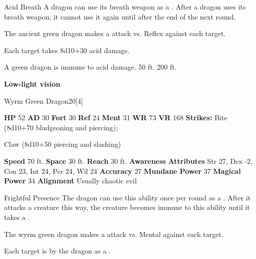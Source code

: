     \begin{freeability}{Acid Breath}
      A dragon can use its breath weapon as a .
      After a dragon uses its breath weapon, it cannot use it again until after the end of the next round.
      \par The ancient green dragon makes a  attack
        vs. Reflex against each target.
    
    \hit Each target takes 8d10+30 acid damage.
    \end{freeability}
  
      
       A green dragon is immune to acid damage.
     50 ft.
     200 ft.
    \par\noindent\textbf{Low-light vision}
  

  \begin{monsubsection}{Wyrm Green Dragon}{20}[4]
    \vspace{-1em}\vspace{-1em}
    \vspace{0em}

    
    

    \begin{spellcontent}
      \begin{spelltargetinginfo}
        \pari \textbf{HP} 52 \monsep
          \textbf{AD} 30 \monsep
          \textbf{Fort} 30 \monsep
          \textbf{Ref} 24 \monsep
          \textbf{Ment} 31
        \pari \textbf{WR} 73 \monsep
        \textbf{VR} 168
        \pari \textbf{Strikes:}
            Bite  (8d10+70 bludgeoning and piercing);
\par Claw  (8d10+50 piercing and slashing)
      \end{spelltargetinginfo}
    \end{spellcontent}
    \begin{monsterfooter}
      \pari \textbf{Speed} 70 ft. \monsep
        \textbf{Space} 30 ft. \monsep
        \textbf{Reach} 30 ft.
      \pari \textbf{Awareness} 
      \pari \textbf{Attributes}
        Str 27, Dex -2,
        Con 23, Int 24,
        Per 24, Wil 24
      \pari \textbf{Accuracy} 27 \monsep
        \textbf{Mundane Power} 37 \monsep
      \textbf{Magical Power} 34
      \pari \textbf{Alignment} Usually chaotic evil
    \end{monsterfooter}
  \end{monsubsection}
  \begin{freeability}{Frightful Presence}
      The dragon can use this ability once per round as a .
      After it attacks a creature this way, the creature becomes immune to this ability until it takes a .
      \par The wyrm green dragon makes a  attack
        vs. Mental against each target.
    
    \hit Each target is  by the dragon as a .
    \end{freeability}
  

